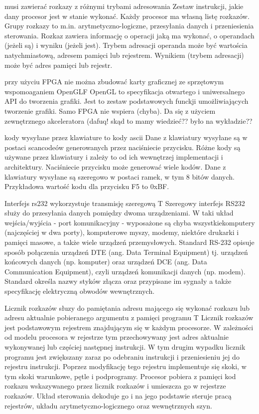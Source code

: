 {musi zawierać rozkazy z różnymi trybami adresowania}{}
{
Zestaw instrukcji, jakie dany procesor jest w stanie wykonać. Każdy procesor ma własną listę rozkazów. Grupy rozkazy to m.in. arytmetyczno-logiczne, przesyłania danych i przeniesienia sterowania. Rozkaz zawiera informację o operacji jaką ma wykonać, o operandach (jeżeli są) i wyniku (jeżeli jest). Trybem adresacji operanda może być wartościa natychmiastową, adresem pamięci lub rejestrem. Wynikiem (trybem adresacji) może być adres pamięci lub rejestr.
}
{}

{przy użyciu FPGA nie można zbudować karty graficznej ze sprzętowym wspomoaganiem OpenGL}{F}
{
OpenGL to specyfikacja otwartego i uniwersalnego API do tworzenia grafiki. Jest to zestaw podstawowych funckji umożliwiających tworzenie grafiki.
}
{Samo FPGA nie wspiera (chyba). Da się z użyciem zewnętrznego akceleratora \cite{fpga:logi3D} (dafuq! skąd to mamy wiedzieć?? było na wykładzie??}

{kody wysyłane przez klawiature to kody ascii}{}
{
Dane z klawiatury wysyłane są w postaci scancodeów generowanych przez naciśniecie przycisku. Różne kody są używane przez klawiatury i zależy to od ich wewnętrzej implementacji i architektury. Naciśniecie przycisku może generować wiele kodów. Dane z klawiatury wysyłane są szeregowo w postaci ramek, w tym 8 bitów danych. Przykładowa wartość kodu dla przycisku F5 to 0xBF.
}
{}


\label{odp:99}
\answer
{Interfejs rs232}
{wykorzystuje transmisję szeregową}
{T}
{
Szeregowy interfejs RS232 służy do przesyłania danych pomiędzy dwoma urządzeniami. W taki układ wejścia/wyjścia - port komunikacyjny - wyposażone są chyba wszystkiekomputery (najczęściej w dwa porty), komputerowe myszy, modemy, niektóre drukarki i pamięci masowe, a także wiele urządzeń przemysłowych.
}
{
Standard RS-232 opisuje sposób połączenia urządzeń DTE (ang. Data Terminal Equipment) tj. urządzeń końcowych danych (np. komputer) oraz urządzeń DCE (ang. Data Communication Equipment), czyli urządzeń komunikacji danych (np. modem). Standard określa nazwy styków złącza oraz przypisane im sygnały a także specyfikację elektryczną obwodów wewnętrznych.
}

\label{odp:100}
\answer
{Licznik rozkazów}
{słuzy do pamiętania adresu mającego się wykonać rozkazu lub adresu aktualnie pobieranego argumentu z pamięci programu}
{T}
{
Licznik rozkazów jest podstawowym rejestrem znajdującym się w każdym procesorze. W zależności od modelu procesora w rejestrze tym przechowywany jest adres aktualnie wykonywanej lub częściej następnej instrukcji. W tym drugim wypadku licznik programu jest zwiększany zaraz po odebraniu instrukcji i przeniesieniu jej do rejestru instrukcji. Poprzez modyfikację tego rejestru implementuje się skoki, w tym skoki warunkowe, pętle i podprogramy.
}
{
Procesor pobiera z pamięci kod rozkazu wskazywanego przez licznik rozkazów i umieszcza go w rejestrze rozkazów. Układ sterowania dekoduje go i na jego podstawie steruje pracą rejestrów, układu arytmetyczno-logicznego oraz wewnętrznych szyn.
}

